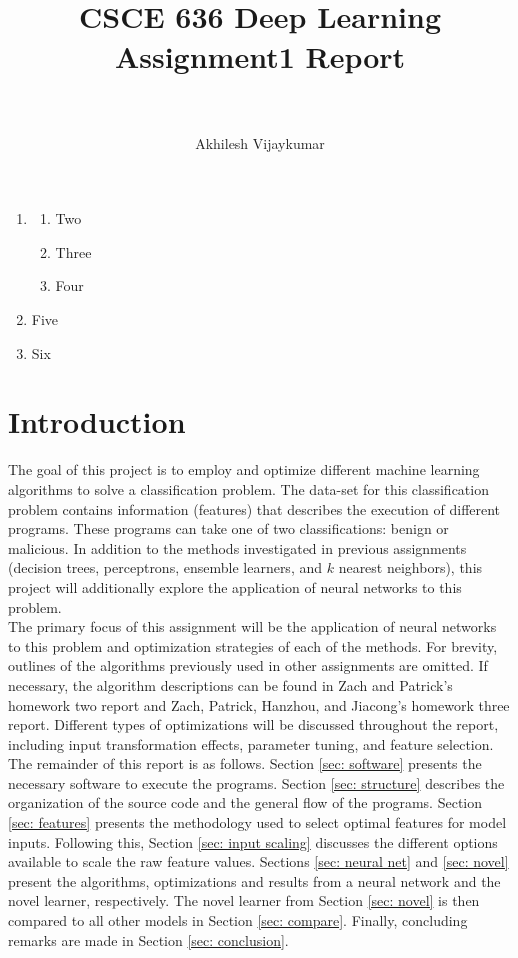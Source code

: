 \documentclass[paper=a4, fontsize=11pt]{scrartcl} %
\title{	
\normalfont \normalsize 
\horrule{0.5pt} \\[0.4cm] %
\LARGE CSCE 636 Deep Learning \\
\LARGE Assignment1 Report \\ %
\horrule{2pt} \\[0.5cm] %
}
\author{Akhilesh Vijaykumar} %
\begin{document}
\maketitle %

\begin{enumerate}
	\item \begin{enumerate}
		\item Two
		\item Three
		\item Four
	\end{enumerate}
	\item Five
	\item Six
\end{enumerate}

\section{Introduction} \label{sec: intro}

The goal of this project is to employ and optimize different machine learning algorithms to solve a classification problem.
The data-set for this classification problem contains information (features) that describes the execution of different programs.
These programs can take one of two classifications: benign or malicious.
In addition to the methods investigated in previous assignments (decision trees, perceptrons, ensemble learners, and $k$ nearest neighbors), this project will additionally explore the application of neural networks to this problem.
\\

The primary focus of this assignment will be the application of neural networks to this problem and optimization strategies of each of the methods.
For brevity, outlines of the algorithms previously used in other assignments are omitted.
If necessary, the algorithm descriptions can be found in Zach and Patrick's homework two report and Zach, Patrick, Hanzhou, and Jiacong's homework three report.
Different types of optimizations will be discussed throughout the report, including input transformation effects, parameter tuning, and feature selection.
\\


The remainder of this report is as follows.
Section \ref{sec: software} presents the necessary software to execute the programs.
Section \ref{sec: structure} describes the organization of the source code and the general flow of the programs.
Section \ref{sec: features} presents the methodology used to select optimal features for model inputs.
Following this, Section \ref{sec: input scaling} discusses the different options available to scale the raw feature values.
Sections \ref{sec: neural net} and \ref{sec: novel} present the algorithms, optimizations and results from a neural network and the novel learner, respectively.
The novel learner from Section \ref{sec: novel} is then compared to all other models in Section \ref{sec: compare}.
Finally, concluding remarks are made in Section \ref{sec: conclusion}.
	
\end{document}
